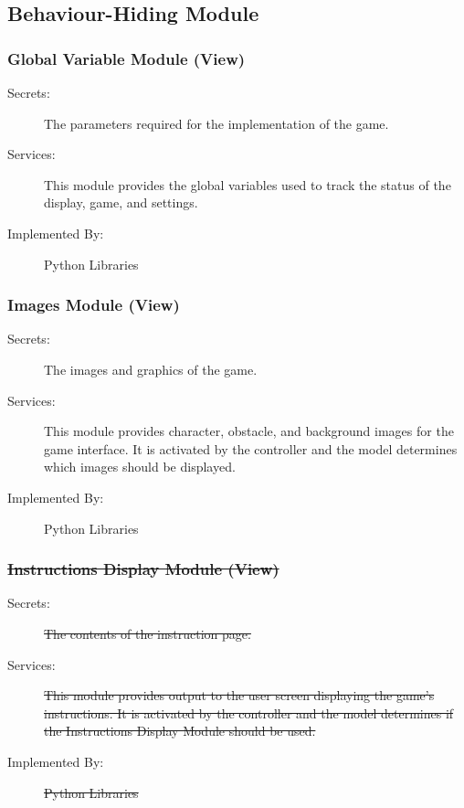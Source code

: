 \documentclass[12pt, titlepage]{article}
\begin{document}
\subsection{Behaviour-Hiding Module}

\subsubsection{Global Variable Module (View)}

\begin{description}
\item[Secrets:] The parameters required for the implementation of the game.
\item[Services:] This module provides the global variables used to track the status of the display, game, and settings. 
\item[Implemented By:] Python Libraries
\end{description}

\subsubsection{Images Module (View)}
\begin{description}
\item[Secrets:]The images and graphics of the game.
\item[Services:] This module provides character, obstacle, and background images for the game interface. It is activated by the controller and the model determines which images should be displayed.
\item[Implemented By:] Python Libraries
\end{description}


\subsubsection{\sout{Instructions Display Module (View)}}
\begin{description}
\item[Secrets:]\sout{The contents of the instruction page.} 
\item[Services:]\sout{ This module provides output to the user screen displaying the game's instructions. It is activated by the controller and the model determines if the Instructions Display Module should be used. }
\item[Implemented By:] \sout{Python Libraries}
\end{description}
\end{document}

